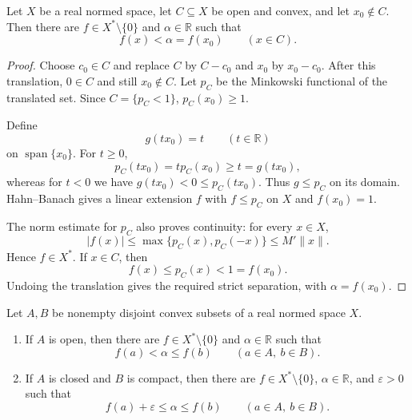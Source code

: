 \begin{notelemma}
Let $X$ be a real normed space, let $C\subseteq X$ be open and convex, and let
$x_0\notin C$.  Then there are
$f\in X^*\setminus\{0\}$ and $\alpha\in\mathbb R$ such that
\[
  f(x)<\alpha=f(x_0)\qquad(x\in C).
\]
\end{notelemma}

\begin{proof}
Choose $c_0\in C$ and replace $C$ by $C-c_0$ and $x_0$ by $x_0-c_0$.
After this translation, $0\in C$ and still $x_0\notin C$.  Let $p_C$ be the
Minkowski functional of the translated set.  Since $C=\{p_C<1\}$,
$p_C(x_0)\ge1$.

Define
\[
  g(t x_0)=t
  \qquad(t\in\mathbb R)
\]
on $\operatorname{span}\{x_0\}$.  For $t\ge0$,
\[
  p_C(t x_0)=t p_C(x_0)\ge t=g(t x_0),
\]
whereas for $t<0$ we have $g(t x_0)<0\le p_C(t x_0)$.  Thus $g\le p_C$ on
its domain.  Hahn--Banach gives a linear extension $f$ with $f\le p_C$ on
$X$ and $f(x_0)=1$.

The norm estimate for $p_C$ also proves continuity: for every $x\in X$,
\[
  |f(x)|\le\max\{p_C(x),p_C(-x)\}\le M'\|x\|.
\]
Hence $f\in X^*$.  If $x\in C$, then
\[
  f(x)\le p_C(x)<1=f(x_0).
\]
Undoing the translation gives the required strict separation, with
$\alpha=f(x_0)$.
\end{proof}

\begin{notetheorem}
Let $A,B$ be nonempty disjoint convex subsets of a real normed space $X$.

\begin{enumerate}
  \item If $A$ is open, then there are $f\in X^*\setminus\{0\}$ and
        $\alpha\in\mathbb R$ such that
        \[
          f(a)<\alpha\le f(b)
          \qquad(a\in A,\ b\in B).
        \]
  \item If $A$ is closed and $B$ is compact, then there are
        $f\in X^*\setminus\{0\}$, $\alpha\in\mathbb R$, and $\varepsilon>0$
        such that
        \[
          f(a)+\varepsilon\le\alpha\le f(b)
          \qquad(a\in A,\ b\in B).
        \]
\end{enumerate}
\end{notetheorem}

